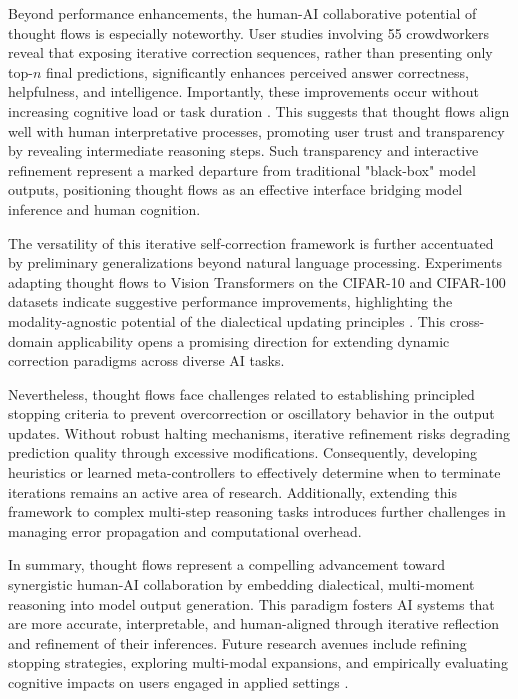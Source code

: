 Beyond performance enhancements, the human-AI collaborative potential of thought flows is especially noteworthy. User studies involving 55 crowdworkers reveal that exposing iterative correction sequences, rather than presenting only top-$n$ final predictions, significantly enhances perceived answer correctness, helpfulness, and intelligence. Importantly, these improvements occur without increasing cognitive load or task duration \cite{ref43}. This suggests that thought flows align well with human interpretative processes, promoting user trust and transparency by revealing intermediate reasoning steps. Such transparency and interactive refinement represent a marked departure from traditional "black-box" model outputs, positioning thought flows as an effective interface bridging model inference and human cognition.

The versatility of this iterative self-correction framework is further accentuated by preliminary generalizations beyond natural language processing. Experiments adapting thought flows to Vision Transformers on the CIFAR-10 and CIFAR-100 datasets indicate suggestive performance improvements, highlighting the modality-agnostic potential of the dialectical updating principles \cite{ref43}. This cross-domain applicability opens a promising direction for extending dynamic correction paradigms across diverse AI tasks.

Nevertheless, thought flows face challenges related to establishing principled stopping criteria to prevent overcorrection or oscillatory behavior in the output updates. Without robust halting mechanisms, iterative refinement risks degrading prediction quality through excessive modifications. Consequently, developing heuristics or learned meta-controllers to effectively determine when to terminate iterations remains an active area of research. Additionally, extending this framework to complex multi-step reasoning tasks introduces further challenges in managing error propagation and computational overhead.

In summary, thought flows represent a compelling advancement toward synergistic human-AI collaboration by embedding dialectical, multi-moment reasoning into model output generation. This paradigm fosters AI systems that are more accurate, interpretable, and human-aligned through iterative reflection and refinement of their inferences. Future research avenues include refining stopping strategies, exploring multi-modal expansions, and empirically evaluating cognitive impacts on users engaged in applied settings \cite{ref43}.

